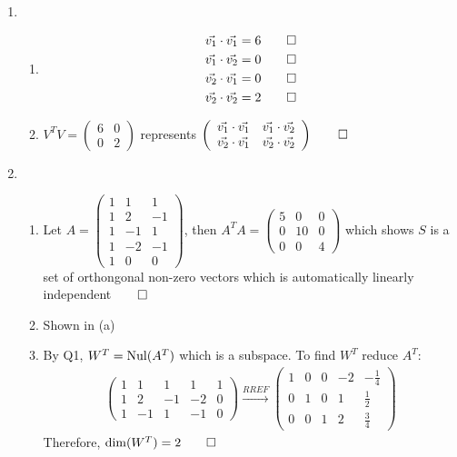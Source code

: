 \documentclass[12pt, a4paper]{article}
\begin{document}
\begin{enumerate}[Q\arabic*.]
  \item 
    \begin{enumerate}[(\alph*)]
      \item 
        \begin{align*}
          \vec{v_1} \cdot \vec{v_1} &= 6 \qed\\
          \vec{v_1} \cdot \vec{v_2} &= 0 \qed\\
          \vec{v_2} \cdot \vec{v_1} &= 0 \qed\\
          \vec{v_2} \cdot \vec{v_2} &= 2 \qed\\
        \end{align*}

      \item $V^TV = \left(\begin{array}{cc} 6 & 0\\ 0 & 2 \end{array}\right)$ represents $\left(\begin{array}{cc} \vec{v_1}\cdot \vec{v_1} & \vec{v_1} \cdot \vec{v_2}\\ \vec{v_2}\cdot \vec{v_1} & \vec{v_2}\cdot \vec{v_2} \end{array}\right) \qed$
    \end{enumerate}


  \item 
    \begin{enumerate}[(\alph*)]
      \item Let $A = \left(\begin{array}{ccc} 1 & 1 & 1\\ 1 & 2 & -1\\ 1 & -1 & 1\\ 1 & -2 & -1\\ 1 & 0 & 0 \end{array}\right)$, then $A^TA = \left(\begin{array}{ccc} 5 & 0 & 0\\ 0 & 10 & 0\\ 0 & 0 & 4 \end{array}\right)$ which shows $S$ is a set of orthongonal non-zero vectors which is automatically linearly independent$\qed$

      \item Shown in (a)

      \item By Q1, $W^T = \operatorname{Nul}(A^T)$ which is a subspace. To find $W^T$ reduce $A^T$:
        \begin{align*}
          \left(\begin{array}{ccccc} 1 & 1 & 1 & 1 & 1\\ 1 & 2 & -1 & -2 & 0\\ 1 & -1 & 1 & -1 & 0 \end{array}\right)
          \xrightarrow{RREF}
          \left(\begin{array}{ccccc} 1 & 0 & 0 & -2 & -\frac{1}{4}\\ 0 & 1 & 0 & 1 & \frac{1}{2}\\ 0 & 0 & 1 & 2 & \frac{3}{4} \end{array}\right)
        \end{align*}
        Therefore, $\dim(W^T) = 2 \qed$


\end{enumerate}
\end{enumerate}
\end{document}
